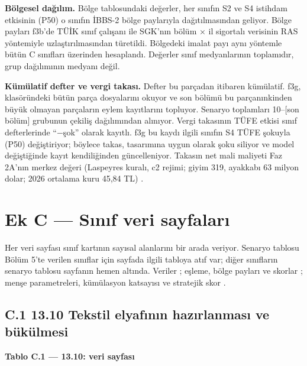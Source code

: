 \textbf{Bölgesel dağılım.} Bölge tablosundaki değerler, her sınıfın S2 ve S4 istihdam etkisinin (P50) o sınıfın İBBS-2 bölge paylarıyla dağıtılmasından geliyor. Bölge payları f3b'de TÜİK sınıf çalışanı ile SGK'nın bölüm × il sigortalı verisinin RAS yöntemiyle uzlaştırılmasından türetildi. Bölgedeki imalat payı aynı yöntemle bütün C sınıfları üzerinden hesaplandı. Değerler sınıf medyanlarının toplamıdır, grup dağılımının medyanı değil.

\textbf{Kümülatif defter ve vergi takası.} Defter bu parçadan itibaren kümülatif. f3g,  klasöründeki bütün parça dosyalarını okuyor ve son bölümü bu parçanınkinden büyük olmayan parçaların eylem kayıtlarını topluyor. Senaryo toplamları 10--{[}son bölüm{]} grubunun çekiliş dağılımından alınıyor. Vergi takasının TÜFE etkisi sınıf defterlerinde ``−şok'' olarak kayıtlı. f3g bu kaydı ilgili sınıfın S4 TÜFE şokuyla (P50) değiştiriyor; böylece takas, tasarımına uygun olarak şoku siliyor ve model değiştiğinde kayıt kendiliğinden güncelleniyor. Takasın net mali maliyeti Faz 2A'nın merkez değeri (Laspeyres kuralı, c2 rejimi; giyim 319, ayakkabı 63 milyon dolar; 2026 ortalama kuru 45,84 TL) \etiketT{}.

\hypertarget{nace_kartlar_13-15-ek-c--sux131nux131f-veri-sayfalarux131}{%
\section{Ek C --- Sınıf veri sayfaları}\label{nace_kartlar_13-15-ek-c--sux131nux131f-veri-sayfalarux131}}

Her veri sayfası sınıf kartının sayısal alanlarını bir arada veriyor. Senaryo tablosu Bölüm 5'te verilen sınıflar için sayfada ilgili tabloya atıf var; diğer sınıfların senaryo tablosu sayfanın hemen altında. Veriler \etiketV{}; eşleme, bölge payları ve skorlar \etiketT{}; menşe parametreleri, kümülasyon katsayısı ve stratejik skor \etiketH{}.

\hypertarget{nace_kartlar_13-15-c1-1310-tekstil-elyafux131nux131n-hazux131rlanmasux131-ve-buxfckuxfclmesi}{%
\subsection{C.1 13.10 Tekstil elyafının hazırlanması ve bükülmesi}\label{nace_kartlar_13-15-c1-1310-tekstil-elyafux131nux131n-hazux131rlanmasux131-ve-buxfckuxfclmesi}}


\textbf{Tablo C.1 --- 13.10: veri sayfası}

